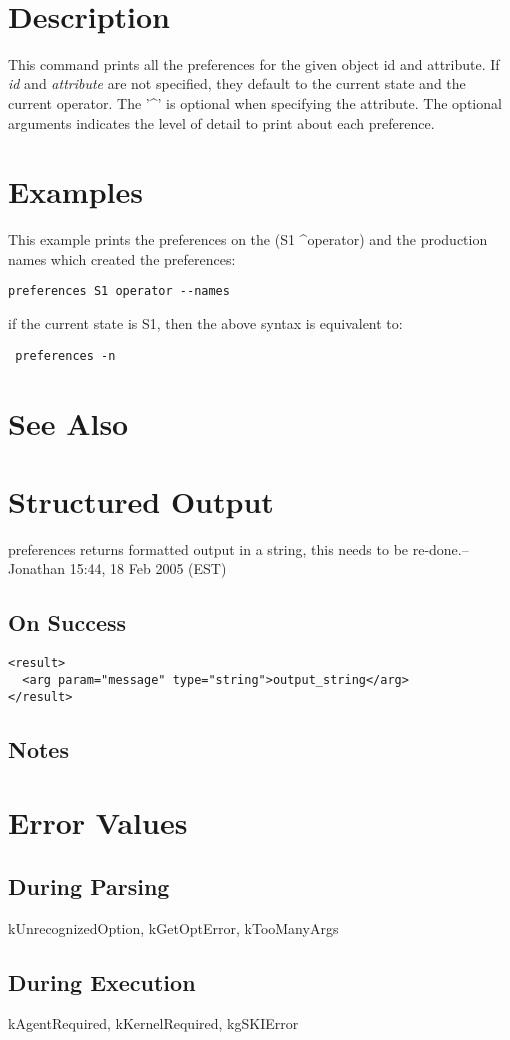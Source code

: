 \documentclass[10pt]{article}
\begin{document}
 \\ 

\section*{ Description }


 This command prints all the preferences for the given object id and attribute. If \emph{id}
 and \emph{attribute}
 are not specified, they default to the current state and the current operator. The '\^{}' is optional when specifying the attribute. The optional arguments indicates the level of detail to print about each preference. 
\section*{ Examples }


 This example prints the preferences on the (S1 \^{}operator) and the production names which created the preferences: \begin{verbatim}
preferences S1 operator --names

\end{verbatim}



 if the current state is S1, then the above syntax is equivalent to: \begin{verbatim}
 preferences -n

\end{verbatim}

\section*{ See Also }
\section*{ Structured Output }


 preferences returns formatted output in a string, this needs to be re-done.--Jonathan 15:44, 18 Feb 2005 (EST) 
\subsection*{ On Success }
\begin{verbatim}
<result>
  <arg param="message" type="string">output_string</arg>
</result>

\end{verbatim}
\subsection*{ Notes }
\section*{ Error Values }
\subsection*{ During Parsing }


 kUnrecognizedOption, kGetOptError, kTooManyArgs
\subsection*{ During Execution }


 kAgentRequired, kKernelRequired, kgSKIError
\end{document}
